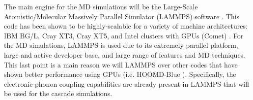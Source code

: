 The main engine for the MD simulations will be the Large-Scale Atomistic/Molecular Massively Parallel Simulator (LAMMPS) software \cite{Plimpton1995, LAMMPSwebsite}. This code has been shown to be highly-scalable for a variety of machine architectures: IBM BG/L, Cray XT3, Cray XT5, and Intel clusters with GPUs (Comet) \cite{LAMMPSbench}. For the MD simulations, LAMMPS is used due to its extremely parallel platform, large and active developer base, and large range of features and MD techniques. This last point is a main reason we will LAMMPS over other codes that have shown better performance using GPUs (i.e. HOOMD-Blue \cite{Anderson2008, Glaser2015}). Specifically, the electronic-phonon coupling capabilities are already present in LAMMPS that will be used for the cascade simulations. 
